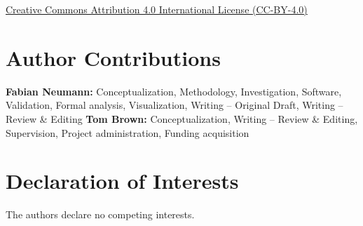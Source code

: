 \documentclass[1p,11pt]{elsarticle}
\begin{document}
\href{http://creativecommons.org/licenses/by/4.0/}{Creative Commons Attribution 4.0
International License (CC-BY-4.0)}

\section*{Author Contributions}

\textbf{Fabian Neumann:} Conceptualization, Methodology, Investigation, Software, Validation, Formal analysis, Visualization, Writing -- Original Draft, Writing -- Review \& Editing
\textbf{Tom Brown:} Conceptualization, Writing -- Review \& Editing, Supervision, Project administration, Funding acquisition

\section*{Declaration of Interests}

The authors declare no competing interests.

\renewcommand{\ttdefault}{\sfdefault}


\newpage
\tableofcontents

% 	
\end{document}
